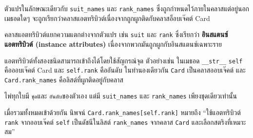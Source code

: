 ตัวแปรในลักษณะเดียวกับ \verb"suit_names" และ \verb"rank_names" ซึ่งถูกกำหนดไว้ภายในคลาสแต่อยู่นอกเมธอดใดๆ  
จะถูกเรียกว่าคลาสแอตทริบิวต์เนื่องจากถูกผูกติดกับคลาสอ็อบเจ๊คต์ Card



คลาสแอตทริบิวต์แยกความแตกต่างจากตัวแปร เช่น {\tt suit} และ {\tt rank} ซึ่งเรียกว่า {\bf อินสแตนซ์แอตทริบิวต์  (instance attributes)} 
เนื่องจากพวกมันถูกผูกกับอินสแตนซ์เฉพาะราย


แอตทริบิวต์ทั้งสองชนิดสามารถเข้าถึงได้โดยใช้สัญกรณ์จุด ตัวอย่างเช่น ในเมธอด \verb"__str__" {\tt self} คือออบเจ๊คต์ Card และ {\tt self.rank} คืออันดับ 
ในทำนองเดียวกัน {\tt Card} เป็นคลาสออบเจ๊คต์ และ \verb"Card.rank_names" คือลิสต์ที่ผูกติดอยู่กับคลาส


ไพ่ทุกใบมี {\tt ชุด}และ {\tt อันดับ}ของตัวเอง แต่มี \verb"suit_names" และ \verb"rank_names" เพียงชุดเดียวเท่านั้น


เมื่อรวมทั้งหมดเข้าด้วยกัน นิพจน์ \verb"Card.rank_names[self.rank]" หมายถึง 
``ใช้แอตทริบิวต์ {\tt rank} จากออบเจ๊คต์ {\tt self} เป็นดัชนีในลิสต์ \verb"rank_names" จากคลาส {\tt Card} และเลือกสตริงที่เหมาะสม''



